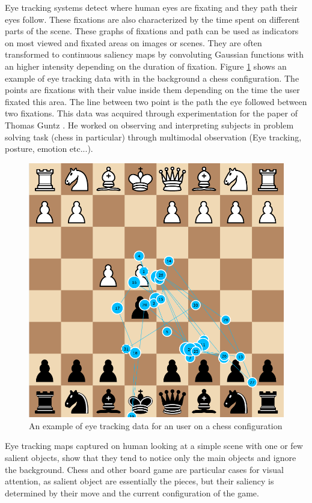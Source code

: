 Eye tracking systems detect where human eyes are fixating and they path their eyes follow. These fixations are also characterized by the time spent on different parts of the scene. These graphs of fixations and path can be used as indicators on most viewed and fixated areas on images or scenes. They are often transformed to continuous saliency maps by convoluting Gaussian functions with an higher intensity depending on the duration of fixation. Figure \ref{fig:exampleeye} shows an example of eye tracking data with in the background a chess configuration. The points are fixations with their value inside them depending on the time the user fixated this area. The line between two point is the path the eye followed between two fixations. This data was acquired through experimentation for the paper of Thomas Guntz \cite{thomasguntz}. He worked on observing and interpreting subjects in problem solving task (chess in particular) through multimodal observation (Eye tracking, posture, emotion etc...).

\begin{figure}
    \centering
    \includegraphics[scale=0.35]{./dataset/image.png}
    \caption{An example of eye tracking data for an user on a chess configuration}
    \label{fig:exampleeye}
\end{figure}

Eye tracking maps captured on human looking at a simple scene with one or few salient objects, show that they tend to notice only the main objects and ignore the background.
Chess and other board game  are particular cases for visual attention, as salient object are essentially the pieces, but their saliency is determined by their move and the current configuration of the game.



